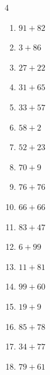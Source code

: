 \begin{multicols}{4}
\begin{enumerate}
  \item $91+82$
        \phantom{$=173$}

  \item $3+86$
        \phantom{$=89$}

  \item $27+22$
        \phantom{$=49$}

  \item $31+65$
        \phantom{$=96$}

  \item $33+57$
        \phantom{$=90$}

  \item $58+2$
        \phantom{$=60$}

  \item $52+23$
        \phantom{$=75$}

  \item $70+9$
        \phantom{$=79$}

  \item $76+76$
        \phantom{$=152$}

  \item $66+66$
        \phantom{$=132$}

  \item $83+47$
        \phantom{$=130$}

  \item $6+99$
        \phantom{$=105$}

  \item $11+81$
        \phantom{$=92$}

  \item $99+60$
        \phantom{$=159$}

  \item $19+9$
        \phantom{$=28$}

  \item $85+78$
        \phantom{$=163$}

  \item $34+77$
        \phantom{$=111$}

  \item $79+61$
        \phantom{$=140$}

\end{enumerate}
\end{multicols}

\newpage
\resetdrill

